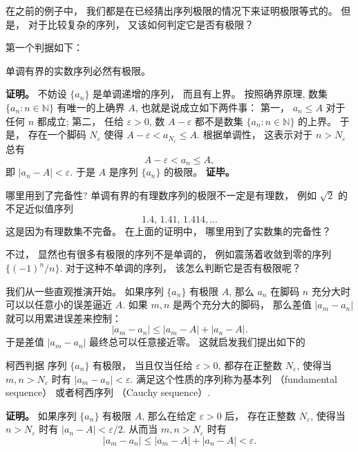 

在之前的例子中， 我们都是在已经猜出序列极限的情况下来证明极限等式的。 但是， 对于比较复杂的序列， 又该如何判定它是否有极限？

第一个判据如下：

\begin{theorem}{}
单调有界的实数序列必然有极限。
\end{theorem}
\textbf{证明。} 不妨设 $\{a_n\}$ 是单调递增的序列， 而且有上界。 按照确界原理, 数集 $\{a_n:n\in\mathbb{N}\}$ 有唯一的上确界 $A$, 也就是说成立如下两件事： 第一， $a_n\leq A$ 对于任何 $n$ 都成立; 第二， 任给 $\varepsilon>0$, 数 $A-\varepsilon$ 都不是数集 $\{a_n:n\in\mathbb{N}\}$ 的上界。 于是， 存在一个脚码 $N_\varepsilon$ 使得 $A-\varepsilon<a_{N_\varepsilon}\leq A$. 根据单调性， 这表示对于 $n>N_\varepsilon$ 总有
\[A-\varepsilon<a_n\leq A,\]
即 $|a_n-A|<\varepsilon$. 于是 $A$ 是序列 $\{a_n\}$ 的极限。 \textbf{证毕。}

\begin{exercise}{哪里用到了完备性?}
单调有界的有理数序列的极限不一定是有理数， 例如 $\sqrt{2}$ 的不足近似值序列
$$
1.4,\,1.41,\,1.414,...
$$
这是因为有理数集不完备。 在上面的证明中， 哪里用到了实数集的完备性？
\end{exercise}

不过， 显然也有很多有极限的序列不是单调的， 例如震荡着收敛到零的序列 $\{(-1)^n/n\}$. 对于这种不单调的序列， 该怎么判断它是否有极限呢？

我们从一些直观推演开始。 如果序列 $\{a_n\}$ 有极限 $A$, 那么 $a_n$ 在脚码 $n$ 充分大时可以以任意小的误差逼近 $A$. 如果 $m,n$ 是两个充分大的脚码， 那么差值 $|a_m-a_n|$ 就可以用累进误差来控制：
$$
|a_m-a_n|\leq |a_m-A|+|a_n-A|.
$$
于是差值 $|a_m-a_n|$ 最终总可以任意接近零。 这就启发我们提出如下的

\begin{theorem}{柯西判据}
序列 $\{a_n\}$ 有极限， 当且仅当任给 $\varepsilon>0$, 都存在正整数 $N_\varepsilon$, 使得当 $m,n>N_\varepsilon$ 时有 $|a_m-a_n|<\varepsilon$. 满足这个性质的序列称为基本列 （fundamental sequence） 或者柯西序列 （Cauchy sequence）.
\end{theorem}

\textbf{证明。} 如果序列 $\{a_n\}$ 有极限 $A$, 那么在给定 $\varepsilon>0$ 后， 存在正整数 $N_\varepsilon$, 使得当 $n>N_\varepsilon$ 时有 $|a_n-A|<\varepsilon/2$. 从而当 $m,n>N_\varepsilon$ 时有
$$
|a_m-a_n|\leq|a_m-A|+|a_n-A|<\varepsilon.
$$

